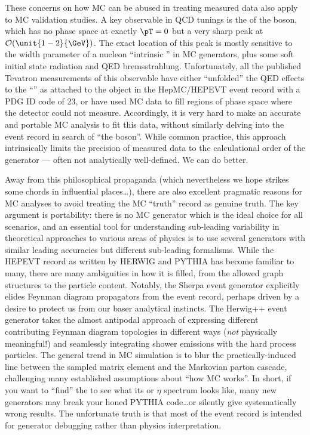 
These concerns on how MC can be abused in treating measured data also apply to
MC validation studies. A key observable in QCD tunings is the \pT of the \PZ
boson, which has no phase space at exactly $\pT = 0$ but a very sharp peak at
$\mathcal{O}(\unit{1-2}{\GeV})$. The exact location of this peak is mostly
sensitive to the width parameter of a nucleon ``intrinsic \pT'' in MC
generators, plus some soft initial state radiation and QED
bremsstrahlung. Unfortunately, all the published Tevatron measurements of this
observable have either ``unfolded'' the QED effects to the ``\PZ \pT'' as
attached to the object in the HepMC/HEPEVT event record with a PDG ID code of
23, or have used MC data to fill regions of phase space where the detector could
not measure. Accordingly, it is very hard to make an accurate and portable MC
analysis to fit this data, without similarly delving into the event record in
search of ``the boson''. While common practice, this approach intrinsically
limits the precision of measured data to the calculational order of the
generator --- often not analytically well-defined. We can do better.

Away from this philosophical propaganda (which nevertheless we hope strikes some
chords in influential places\dots), there are also excellent pragmatic reasons
for MC analyses to avoid treating the MC ``truth'' record as genuine truth. The
key argument is portability: there is no MC generator which is the ideal choice
for all scenarios, and an essential tool for understanding sub-leading
variability in theoretical approaches to various areas of physics is to use
several generators with similar leading accuracies but different sub-leading
formalisms. While the HEPEVT record as written by HERWIG and PYTHIA has become
familiar to many, there are many ambiguities in how it is filled, from the
allowed graph structures to the particle content. Notably, the Sherpa event
generator explicitly elides Feynman diagram propagators from the event record,
perhaps driven by a desire to protect us from our baser analytical
instincts. The Herwig++ event generator takes the almost antipodal approach of
expressing different contributing Feynman diagram topologies in different ways
(\emph{not} physically meaningful!) and seamlessly integrating shower emissions
with the hard process particles. The general trend in MC simulation is to blur
the practically-induced line between the sampled matrix element and the
Markovian parton cascade, challenging many established assumptions about ``how
MC works''. In short, if you want to ``find'' the \PZ to see what its \pT or
$\eta$ spectrum looks like, many new generators may break your honed PYTHIA
code\dots or silently give systematically wrong results. The unfortunate truth
is that most of the event record is intended for generator debugging rather than
physics interpretation.

